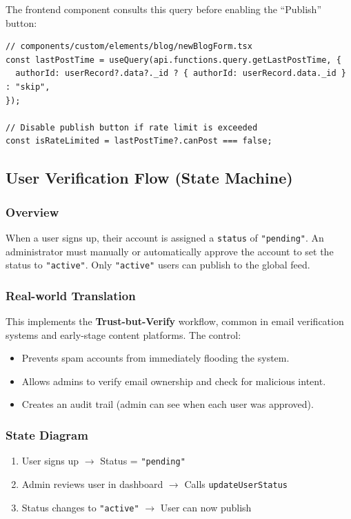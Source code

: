 \documentclass[11pt,a4paper]{article}
\begin{document}
The frontend component consults this query before enabling the ``Publish'' button:
\begin{lstlisting}
// components/custom/elements/blog/newBlogForm.tsx
const lastPostTime = useQuery(api.functions.query.getLastPostTime, {
  authorId: userRecord?.data?._id ? { authorId: userRecord.data._id } : "skip",
});

// Disable publish button if rate limit is exceeded
const isRateLimited = lastPostTime?.canPost === false;
\end{lstlisting}

\subsection{User Verification Flow (State Machine)}

\subsubsection{Overview}
When a user signs up, their account is assigned a \texttt{status} of \texttt{"pending"}. An administrator must manually or automatically approve the account to set the status to \texttt{"active"}. Only \texttt{"active"} users can publish to the global feed.

\subsubsection{Real-world Translation}
This implements the \textbf{Trust-but-Verify} workflow, common in email verification systems and early-stage content platforms. The control:
\begin{itemize}
    \item Prevents spam accounts from immediately flooding the system.
    \item Allows admins to verify email ownership and check for malicious intent.
    \item Creates an audit trail (admin can see when each user was approved).
\end{itemize}

\subsubsection{State Diagram}
\begin{enumerate}
    \item User signs up $\rightarrow$ Status = \texttt{"pending"}
    \item Admin reviews user in dashboard $\rightarrow$ Calls \texttt{updateUserStatus}
    \item Status changes to \texttt{"active"} $\rightarrow$ User can now publish
\end{enumerate}
\end{document}
